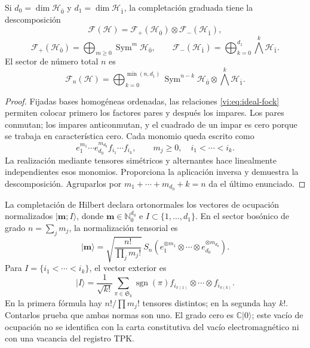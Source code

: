 \begin{theorem}
\label{vi:thm:fock-graduado}
Si \(d_0=\dim\mathcal H_{\bar0}\) y
\(d_1=\dim\mathcal H_{\bar1}\), la completación graduada tiene
la descomposición
\begin{equation}
 \mathcal F(\mathcal H)=
 \mathcal F_+(\mathcal H_{\bar0})\otimes
 \mathcal F_-(\mathcal H_{\bar1}),
 \label{vi:eq:fock-producto}
\end{equation}
\[
 \mathcal F_+(\mathcal H_{\bar0})=
 \bigoplus_{m\ge0}\operatorname{Sym}^m\mathcal H_{\bar0},
 \qquad
 \mathcal F_-(\mathcal H_{\bar1})=
 \bigoplus_{k=0}^{d_1}\bigwedge^k\mathcal H_{\bar1}.
\]
El sector de número total \(n\) es
\[
 \mathcal F_n(\mathcal H)=
 \bigoplus_{k=0}^{\min(n,d_1)}
 \operatorname{Sym}^{n-k}\mathcal H_{\bar0}
 \otimes\bigwedge^k\mathcal H_{\bar1}.
\]
\end{theorem}
\begin{proof}
Fijadas bases homogéneas ordenadas, las relaciones
\eqref{vi:eq:ideal-fock} permiten colocar primero los factores pares
y después los impares. Los pares conmutan; los impares anticonmutan,
y el cuadrado de un impar es cero porque se trabaja en característica
cero. Cada monomio queda escrito como
\[
 e_1^{m_1}\cdots e_{d_0}^{m_{d_0}}
 f_{i_1}\cdots f_{i_k},
 \qquad m_j\ge0,\quad i_1<\cdots<i_k.
\]
La realización mediante tensores simétricos y alternantes hace
linealmente independientes esos monomios. Proporciona la aplicación
inversa y demuestra la descomposición. Agruparlos por
\(m_1+\cdots+m_{d_0}+k=n\) da el último enunciado.
\end{proof}

La completación de Hilbert declara ortonormales los vectores de
ocupación normalizados \(|\boldsymbol m;I\rangle\), donde
\(\boldsymbol m\in\mathbb N_0^{d_0}\) e
\(I\subset\{1,\ldots,d_1\}\). En el sector bosónico de grado
\(n=\sum_jm_j\), la normalización tensorial es
\[
 |\boldsymbol m\rangle=
 \sqrt{\frac{n!}{\prod_jm_j!}}\,
 S_n(e_1^{\otimes m_1}\otimes\cdots\otimes
 e_{d_0}^{\otimes m_{d_0}}).
\]
Para \(I=\{i_1<\cdots<i_k\}\), el vector exterior es
\[
 |I\rangle=\frac1{\sqrt{k!}}\sum_{\pi\in\mathfrak S_k}
 \operatorname{sgn}(\pi)
 f_{i_{\pi(1)}}\otimes\cdots\otimes f_{i_{\pi(k)}}.
\]
En la primera fórmula hay \(n!/\prod m_j!\) tensores distintos;
en la segunda hay \(k!\). Contarlos prueba que ambas normas son uno.
El grado cero es \(\mathbb C|0\rangle\); este vacío de ocupación
no se identifica con la carta constitutiva del vacío electromagnético
ni con una vacancia del registro TPK.

